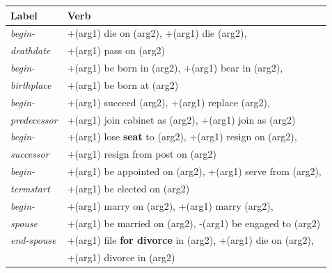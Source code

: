 \begin{table}[t]
\begin{scriptsize}
\begin{center}
\begin{tabular}{|l|l|}
\hline
Label & Verb \\
\hline
\textit{begin-} &+(arg1) die on (arg2), +(arg1) die (arg2), \\
\textit{deathdate}& +(arg1) pass on (arg2) \\
\hline
\textit{begin-} &+(arg1) be born in (arg2), +(arg1) bear in (arg2), \\
\textit{birthplace}&+(arg1) be born at (arg2) \\
\hline
\textit{begin-} &+(arg1) succeed (arg2), +(arg1) replace (arg2), \\
\textit{predecessor}& +(arg1) join cabinet as (arg2), +(arg1) join as (arg2) \\
\hline
\textit{begin-} &+(arg1) lose \textbf{seat} to (arg2), +(arg1) resign on (arg2), \\
\textit{successor}& +(arg1) resign from post on (arg2) \\ %
\hline
\textit{begin-} &+(arg1) be appointed on (arg2), +(arg1) serve from (arg2), \\
\textit{termstart}& +(arg1) be elected on (arg2) \\
\hline
\textit{begin-} &+(arg1) marry on (arg2), +(arg1) marry (arg2), \\
\textit{spouse}& +(arg1) be married on (arg2), -(arg1) be engaged to (arg2) \\
\hline
\textit{end-spouse} &+(arg1) file \textbf{for divorce} in (arg2), +(arg1) die on (arg2), \\
& +(arg1) divorce in (arg2) \\%

\end{tabular}
\end{center}
\end{scriptsize}
\end{table}
